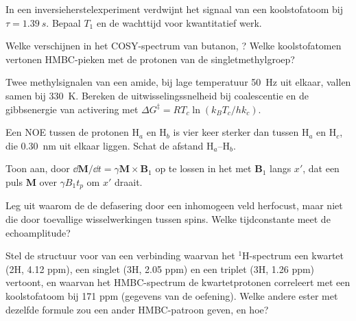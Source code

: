 \begin{exercise}[$\star\star$]\label{exo:b3:advanced-nmr:6}
In een inversieherstelexperiment verdwijnt het signaal van een
koolstofatoom bij
$\tau = \qty{1.39}{s}$. Bepaal $T_1$ en de wachttijd voor kwantitatief werk.
\end{exercise}

\begin{exercise}[$\star\star$]\label{exo:b3:advanced-nmr:7}
Welke  verschijnen in het COSY-spectrum van butanon,
? Welke koolstofatomen vertonen HMBC-pieken met de
protonen van de singletmethylgroep?
\end{exercise}

\begin{exercise}[$\star\star$]\label{exo:b3:advanced-nmr:8}
Twee methylsignalen van een amide, bij lage temperatuur \qty{50}{Hz} uit
elkaar, vallen samen bij
\qty{330}{K}. Bereken de uitwisselingssnelheid bij coalescentie en de
gibbsenergie van activering met $\Delta G^\ddagger = RT_c\ln(k_BT_c/hk_c)$.
\end{exercise}

\begin{exercise}[$\star\star$]\label{exo:b3:advanced-nmr:9}
Een NOE tussen de protonen H$_a$ en H$_b$ is vier keer sterker dan tussen H$_a$ en
H$_c$, die \qty{0.30}{nm} uit elkaar liggen. Schat de afstand H$_a$--H$_b$.
\end{exercise}

\begin{exercise}[$\star\star\star$]\label{exo:b3:advanced-nmr:10}
Toon aan, door $\dd\mathbf M/\dd t = \gamma\mathbf M\times\mathbf B_1$ op te
lossen in het 
met $\mathbf B_1$ langs $x'$, dat een puls $\mathbf M$ over $\gamma B_1t_p$ om $x'$ draait.
\end{exercise}

\begin{exercise}[$\star\star\star$]\label{exo:b3:advanced-nmr:11}
Leg uit waarom de  de defasering door een inhomogeen veld
herfocust, maar niet die door toevallige wisselwerkingen tussen spins.
Welke tijdconstante meet de echoamplitude?
\end{exercise}

\begin{exercise}[$\star\star\star$]\label{exo:b3:advanced-nmr:12}
Stel de structuur voor van een verbinding  waarvan het
${}^1$H-spectrum een kwartet (2H, 4.12 ppm), een singlet (3H, 2.05 ppm) en
een triplet (3H,
1.26 ppm) vertoont, en waarvan het HMBC-spectrum de kwartetprotonen
correleert met een koolstofatoom bij 171 ppm (gegevens van de oefening).
Welke andere ester met dezelfde formule zou een ander HMBC-patroon geven,
en hoe?
\end{exercise}

